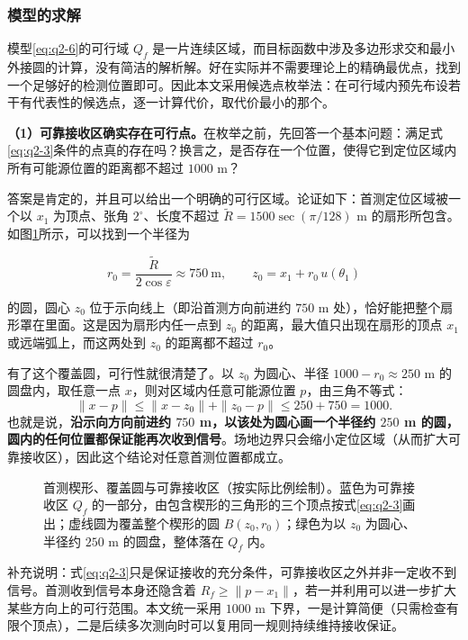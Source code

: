 \subsubsection{模型的求解}\label{sec:q2-3}

模型\eqref{eq:q2-6}的可行域 $Q_f$ 是一片连续区域，而目标函数中涉及多边形求交和最小外接圆的计算，没有简洁的解析解。好在实际并不需要理论上的精确最优点，找到一个足够好的检测位置即可。因此本文采用候选点枚举法：在可行域内预先布设若干有代表性的候选点，逐一计算代价，取代价最小的那个。

\textbf{（1）可靠接收区确实存在可行点。}在枚举之前，先回答一个基本问题：满足式\eqref{eq:q2-3}条件的点真的存在吗？换言之，是否存在一个位置，使得它到定位区域内所有可能源位置的距离都不超过 $1000$ m？

答案是肯定的，并且可以给出一个明确的可行区域。论证如下：首测定位区域被一个以 $x_1$ 为顶点、张角 $2^\circ$、长度不超过 $\widetilde R=1500\sec(\pi/128)$ m 的扇形所包含。如图\ref{fig:q23-1}所示，可以找到一个半径为

\begin{equation}\label{eq:q2-4}
r_0=\frac{\widetilde R}{2\cos\varepsilon}\approx750\ \text{m},\qquad z_0=x_1+r_0\,u(\theta_1)
\end{equation}

的圆，圆心 $z_0$ 位于示向线上（即沿首测方向前进约 $750$ m 处），恰好能把整个扇形罩在里面。这是因为扇形内任一点到 $z_0$ 的距离，最大值只出现在扇形的顶点 $x_1$ 或远端弧上，而这两处到 $z_0$ 的距离都不超过 $r_0$。

有了这个覆盖圆，可行性就很清楚了。以 $z_0$ 为圆心、半径 $1000-r_0\approx250$ m 的圆盘内，取任意一点 $x$，则对区域内任意可能源位置 $p$，由三角不等式：
$$\|x-p\|\le\|x-z_0\|+\|z_0-p\|\le250+750=1000.$$
也就是说，\textbf{沿示向方向前进约 $750$ m，以该处为圆心画一个半径约 $250$ m 的圆，圆内的任何位置都保证能再次收到信号}。场地边界只会缩小定位区域（从而扩大可靠接收区），因此这个结论对任意首测位置都成立。

\begin{figure}[!htbp]
\centering
\QTwoRegionFigure
\caption{首测楔形、覆盖圆与可靠接收区（按实际比例绘制）。蓝色为可靠接收区 $Q_f$ 的一部分，由包含楔形的三角形的三个顶点按式\eqref{eq:q2-3}画出；虚线圆为覆盖整个楔形的圆 $B(z_0,r_0)$；绿色为以 $z_0$ 为圆心、半径约 $250$ m 的圆盘，整体落在 $Q_f$ 内。}
\label{fig:q23-1}
\end{figure}

补充说明：式\eqref{eq:q2-3}只是保证接收的充分条件，可靠接收区之外并非一定收不到信号。首测收到信号本身还隐含着 $R_f\ge\|p-x_1\|$，若一并利用可以进一步扩大某些方向上的可行范围。本文统一采用 $1000$ m 下界，一是计算简便（只需检查有限个顶点），二是后续多次测向时可以复用同一规则持续维持接收保证。

